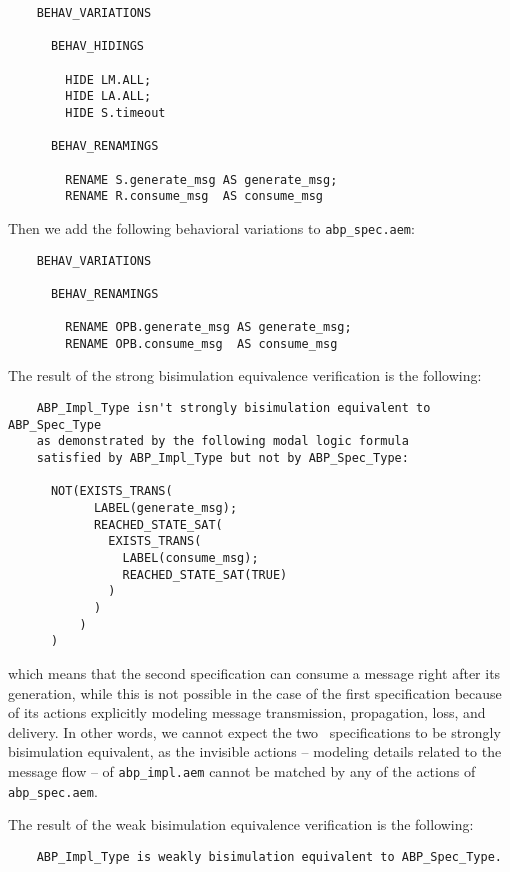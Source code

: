 	\begin{verbatim}
    BEHAV_VARIATIONS

      BEHAV_HIDINGS

        HIDE LM.ALL;
        HIDE LA.ALL;
        HIDE S.timeout

      BEHAV_RENAMINGS

        RENAME S.generate_msg AS generate_msg;
        RENAME R.consume_msg  AS consume_msg
	\end{verbatim}

\noindent Then we add the following behavioral variations to {\tt abp\_spec.aem}:

	\begin{verbatim}
    BEHAV_VARIATIONS

      BEHAV_RENAMINGS

        RENAME OPB.generate_msg AS generate_msg;
        RENAME OPB.consume_msg  AS consume_msg
	\end{verbatim}

The result of the strong bisimulation equivalence verification is the following:

	\begin{verbatim}
    ABP_Impl_Type isn't strongly bisimulation equivalent to ABP_Spec_Type
    as demonstrated by the following modal logic formula
    satisfied by ABP_Impl_Type but not by ABP_Spec_Type:

      NOT(EXISTS_TRANS(
            LABEL(generate_msg); 
            REACHED_STATE_SAT(
              EXISTS_TRANS(
                LABEL(consume_msg); 
                REACHED_STATE_SAT(TRUE)
              )
            )
          )
      )
	\end{verbatim}

\noindent which means that the second specification can consume a message right after its generation, while
this is not possible in the case of the first specification because of its actions explicitly modeling
message transmission, propagation, loss, and delivery. In other words, we cannot expect the two \aemilia\
specifications to be strongly bisimulation equivalent, as the invisible actions -- modeling details related
to the message flow -- of {\tt abp\_impl.aem} cannot be matched by any of the actions of
{\tt abp\_spec.aem}.

The result of the weak bisimulation equivalence verification is the following:

	\begin{verbatim}
    ABP_Impl_Type is weakly bisimulation equivalent to ABP_Spec_Type.
	\end{verbatim}

